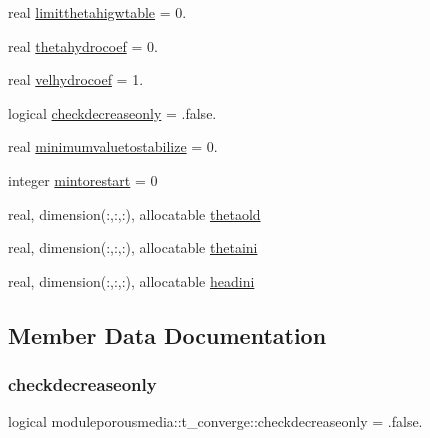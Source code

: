 \begin{DoxyCompactItemize}
\item 
real \mbox{\hyperlink{structmoduleporousmedia_1_1t__converge_a97f4e568296970e5a4fbe350c2156859}{limitthetahigwtable}} = 0.
\item 
real \mbox{\hyperlink{structmoduleporousmedia_1_1t__converge_a91c5807821936146f9457b805a1ddf4c}{thetahydrocoef}} = 0.
\item 
real \mbox{\hyperlink{structmoduleporousmedia_1_1t__converge_a95f5af950d834e7f9dc56632f492fb0c}{velhydrocoef}} = 1.
\item 
logical \mbox{\hyperlink{structmoduleporousmedia_1_1t__converge_a339e3add3e3c9634889d72ac92cdb73b}{checkdecreaseonly}} = .false.
\item 
real \mbox{\hyperlink{structmoduleporousmedia_1_1t__converge_ac7ca472e956dfb3a47383755128e61eb}{minimumvaluetostabilize}} = 0.
\item 
integer \mbox{\hyperlink{structmoduleporousmedia_1_1t__converge_a337a144561039626f70ed82ef563c9ad}{mintorestart}} = 0
\item 
real, dimension(\+:,\+:,\+:), allocatable \mbox{\hyperlink{structmoduleporousmedia_1_1t__converge_a7947f7816da91a9c8a5d932af036d6c1}{thetaold}}
\item 
real, dimension(\+:,\+:,\+:), allocatable \mbox{\hyperlink{structmoduleporousmedia_1_1t__converge_afbc21e090725585bf4a59f8b3958ee78}{thetaini}}
\item 
real, dimension(\+:,\+:,\+:), allocatable \mbox{\hyperlink{structmoduleporousmedia_1_1t__converge_a29935f0219a1032236501177a508942d}{headini}}
\end{DoxyCompactItemize}


\subsection{Member Data Documentation}
\mbox{\label{structmoduleporousmedia_1_1t__converge_a339e3add3e3c9634889d72ac92cdb73b}} 
\subsubsection{\texorpdfstring{checkdecreaseonly}{checkdecreaseonly}}
{\footnotesize\ttfamily logical moduleporousmedia\+::t\+\_\+converge\+::checkdecreaseonly = .false.\hspace{0.3cm}{\ttfamily [private]}}

